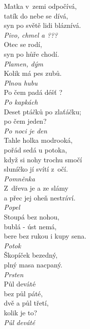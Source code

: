 \begin{multicols}{3}
\noindent
Matka v~zemi odpočívá,\\
tatík do nebe se dívá,\\
syn po světě lidi bláznívá.\\[1 mm]
{\sl Pivo, chmel a ???}\\

\noindent
Otec se rodí,\\
syn po hůře chodí.\\[1 mm]
{\sl Plamen, dým}\\

\noindent
Kolik má pes zubů.\\[1 mm]
{\sl Plnou hubu}\\

\noindent
Po čem padá déšť ?\\[1 mm]
{\sl Po kapkách}\\

\noindent
Deset ptáčků po zlaťáčku;\\
po čem jeden?\\[1 mm]
{\sl Po noci je den}\\

\noindent
Tahle holka modrooká,\\
pořád sedá u potoka,\\
když si nohy trochu smočí\\
sluníčko jí svítí z~očí.\\[1 mm]
{\sl Pomněnka}\\

\noindent
Z~dřeva je a ze slámy\\
a přec jej oheň nestráví.\\[1 mm]
{\sl Popel}\\

\noindent
Stoupá bez nohou,\\
bublá - úst nemá,\\
bere bez rukou i kupy sena.\\[1 mm]
{\sl Potok}\\

\noindent
Škopíček bezedný,\\
plný masa nacpaný.\\[1 mm]
{\sl Prsten}\\

\noindent
Půl deváté\\
bez půl páté,\\
dvě a půl třetí,\\
kolik je to?\\[1 mm]
{\sl Půl deváté}\\


\end{multicols}
